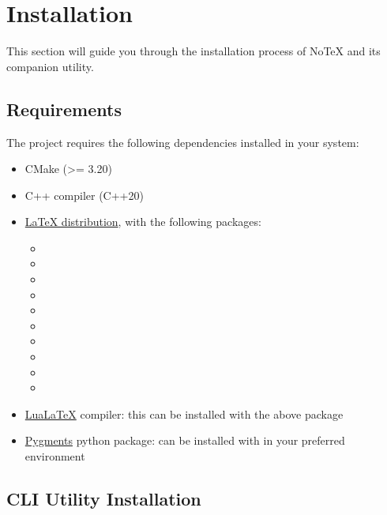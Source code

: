 \documentclass[../main.tex]{subfiles}
\begin{document}
\section{Installation}

This section will guide you through the installation process of NoTeX and its companion utility.

\subsection{Requirements}

The project requires the following dependencies installed in your system:

\begin{itemize}
    \item CMake (>= 3.20)
    \item C++ compiler (C++20)
    \item \href{https://www.latex-project.org/get/}{LaTeX distribution}, with the following packages:
    \begin{itemize}
        \item {}
        \item {}
        \item {}
        \item {}
        \item {}
        \item {}
        \item {}
        \item {}
        \item {}
        \item {}
    \end{itemize}
    \item \href{https://www.luatex.org/}{LuaLaTeX} compiler: this can be installed with the above  package
    \item \href{https://pygments.org/}{Pygments} python package: can be installed with  in your preferred environment
\end{itemize}

\subsection{CLI Utility Installation}
\end{document}

